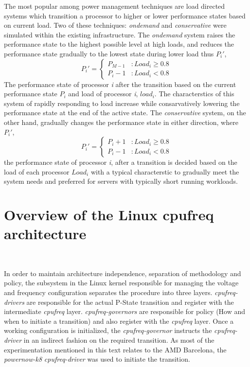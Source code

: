 The most popular among power management techniques are load directed systems
which transition a processor to higher or lower performance states based on current load. Two
of these techniques: \textit{ondemand}\cite{OnDemand} and \textit{conservative} 
were simulated within the existing infrastructure. The \textit{ondemand}
system raises the performance state to the highest possible level at high loads, and
reduces the performance state gradually to the lowest state during lower load thus $P_i'$,
\begin{equation}
    P_{i}' = \left\{ \begin{array}{lr} 
                   P_{M-1} & : Load_i \geq 0.8 \\
		   P_{i}-1 & : Load_i < 0.8
                  \end{array} \right.
\label{fig:math_ondemand}
\end{equation}
The performance state of processor \textit{i} after the transition based on the current 
performance state $P_i$ and load of processor \textit{i}, $load_i$. The characterstics of
this system of rapidly responding to load increase while consarvatively lowering the performance
state at the end of the active state.
The \textit{conservative}
system, on the other hand, gradually changes the performance state in either direction, where $P_i'$,
\begin{equation}
    P_{i}' = \left\{ \begin{array}{lr} 
                   P_{i}+1 & : Load_i \geq 0.8 \\
		   P_{i}-1 & : Load_i < 0.8
                  \end{array} \right.
\label{fig:math_conservative}
\end{equation}
the performance state of processor \textit{i}, after a transition is decided based on the load of each 
processor $Load_i$ with a typical characterstic to gradually meet the system needs and preferred for
servers with typically short running workloads.

\section{Overview of the Linux cpufreq architecture}~\label{sec:cpufreq}

In order to maintain architecture independence, separation of methodology 
and policy, the subsystem in the Linux kernel responsible for managing the 
voltage and frequency configuration separates the procedure into three layers. \textit{cpufreq-drivers}
are responsible for the actual P-State transition and register with the 
intermediate \textit{cpufreq} layer. \textit{cpufreq-governors} are responsible for
policy (How and when to initiate a transition) and also register with the 
\textit{cpufreq} layer. Once a working configuration is initialized, the 
\textit{cpufreq-governor} instructs the \textit{cpufreq-driver} in an indirect
fashion on the required transition. As most of the experimentation mentioned in
this text relates to the AMD Barcelona, the \textit{powernow-k8} \textit{cpufreq-driver}
was used to initiate the transition. 

